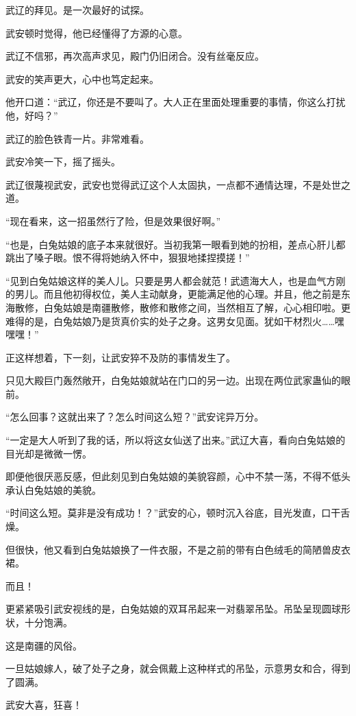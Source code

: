 \begin{this_body}
武辽的拜见。是一次最好的试探。

武安顿时觉得，他已经懂得了方源的心意。

武辽不信邪，再次高声求见，殿门仍旧闭合。没有丝毫反应。

武安的笑声更大，心中也笃定起来。

他开口道：“武辽，你还是不要叫了。大人正在里面处理重要的事情，你这么打扰他，好吗？”

武辽的脸色铁青一片。非常难看。

武安冷笑一下，摇了摇头。

武辽很蔑视武安，武安也觉得武辽这个人太固执，一点都不通情达理，不是处世之道。

“现在看来，这一招虽然行了险，但是效果很好啊。”

“也是，白兔姑娘的底子本来就很好。当初我第一眼看到她的扮相，差点心肝儿都跳出了嗓子眼。恨不得将她纳入怀中，狠狠地揉捏摸搓！”

“见到白兔姑娘这样的美人儿。只要是男人都会就范！武遗海大人，也是血气方刚的男儿。而且他初得权位，美人主动献身，更能满足他的心理。并且，他之前是东海散修，白兔姑娘是南疆散修，散修和散修之间，当然相互了解，心心相印啦。更难得的是，白兔姑娘乃是货真价实的处子之身。这男女见面。犹如干材烈火……嘿嘿嘿！”

正这样想着，下一刻，让武安猝不及防的事情发生了。

只见大殿巨门轰然敞开，白兔姑娘就站在门口的另一边。出现在两位武家蛊仙的眼前。

“怎么回事？这就出来了？怎么时间这么短？”武安诧异万分。

“一定是大人听到了我的话，所以将这女仙送了出来。”武辽大喜，看向白兔姑娘的目光却是微微一愣。

即便他很厌恶反感，但此刻见到白兔姑娘的美貌容颜，心中不禁一荡，不得不低头承认白兔姑娘的美貌。

“时间这么短。莫非是没有成功！？”武安的心，顿时沉入谷底，目光发直，口干舌燥。

但很快，他又看到白兔姑娘换了一件衣服，不是之前的带有白色绒毛的简陋兽皮衣裙。

而且！

更紧紧吸引武安视线的是，白兔姑娘的双耳吊起来一对翡翠吊坠。吊坠呈现圆球形状，十分饱满。

这是南疆的风俗。

一旦姑娘嫁人，破了处子之身，就会佩戴上这种样式的吊坠，示意男女和合，得到了圆满。

武安大喜，狂喜！


\end{this_body}
